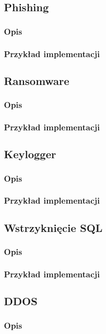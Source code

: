 \documentclass[12pt,twoside]{article}
\begin{document}
\subsection{Phishing}
\subsubsection{Opis}
\subsubsection{Przykład implementacji}
\subsection{Ransomware}
\subsubsection{Opis}
\subsubsection{Przykład implementacji}
\subsection{Keylogger}
\subsubsection{Opis}
\subsubsection{Przykład implementacji}
\subsection{Wstrzyknięcie SQL}
\subsubsection{Opis}
\subsubsection{Przykład implementacji}
\subsection{DDOS}
\subsubsection{Opis}
\end{document}
